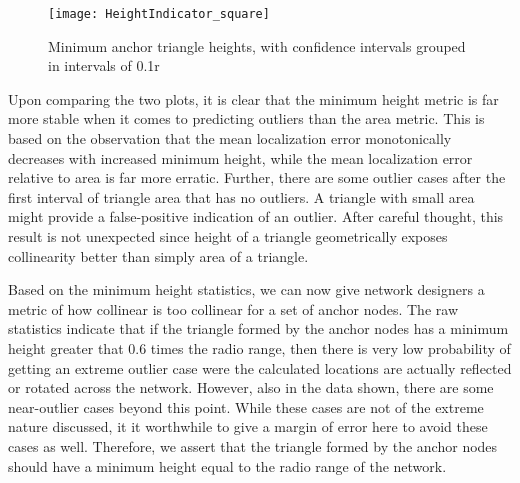\begin{figure}
  \centering
	\texttt{[image: HeightIndicator\_square]}
	\caption[Minimum anchor triangle heights]{Minimum anchor triangle heights, with confidence intervals grouped in intervals of 0.1r}	
	\label{fig:heightIndicator}
\end{figure}

Upon comparing the two plots, it is clear that the minimum height metric is far more stable when it comes to predicting outliers than the area metric.  This is based on the observation that the mean localization error monotonically decreases with increased minimum height, while the mean localization error relative to area is far more erratic.  Further, there are some outlier cases after the first interval of triangle area that has no outliers.  A triangle with small area might provide a false-positive indication of an outlier.  After careful thought, this result is not unexpected since height of a triangle geometrically exposes collinearity better than simply area of a triangle.

Based on the minimum height statistics, we can now give network designers a metric of how collinear is too collinear for a set of anchor nodes.  The raw statistics indicate that if the triangle formed by the anchor nodes has a minimum height greater that 0.6 times the radio range, then there is very low probability of getting an extreme outlier case were the calculated locations are actually reflected or rotated across the network.  However, also in the data shown, there are some near-outlier cases beyond this point.  While these cases are not of the extreme nature discussed, it it worthwhile to give a margin of error here to avoid these cases as well.  Therefore, we assert that the triangle formed by the anchor nodes should have a minimum height equal to the radio range of the network.
